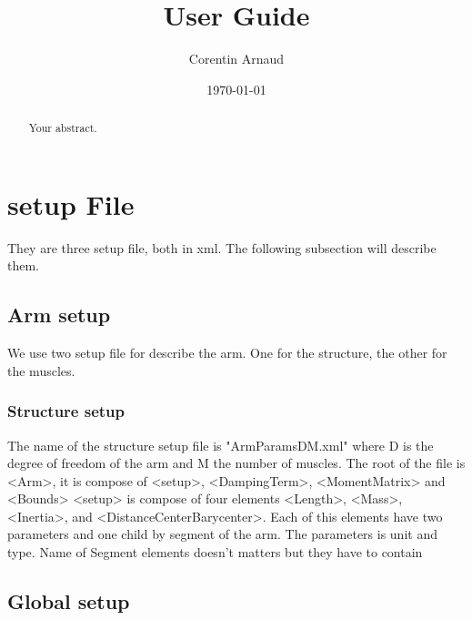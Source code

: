 \documentclass[a4paper]{article}
\title{User Guide}
\author{Corentin Arnaud}
\date{\today}
\begin{document}
\maketitle

\begin{abstract}
Your abstract.
\end{abstract}

\section{setup File}
They are three setup file, both in xml. The following subsection will describe them.
\subsection{Arm setup}
We use two setup file for describe the arm. One for the structure, the other for the muscles.
\subsubsection{Structure setup}
The name of the structure setup file is "ArmParamsDM.xml" where D is the degree of freedom of the arm and M the number of muscles.
The root of the file is <Arm>, it is compose of <setup>, <DampingTerm>, <MomentMatrix> and <Bounds>
<setup> is compose of four elements <Length>, <Mass>, <Inertia>, and <DistanceCenterBarycenter>. Each of this elements have two parameters and one child by segment of the arm. The parameters is  unit and type.
Name of Segment elements doesn't matters but they have to contain  

\subsection{Global setup}
\end{document}
